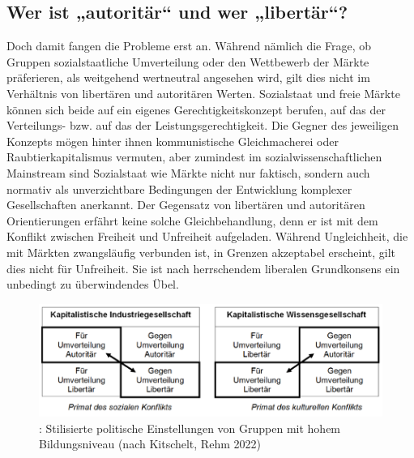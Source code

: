 \begin{multicols*}{2}
\section{Wer ist „autoritär“ und wer „libertär“?}

\noindent Doch damit fangen die Probleme erst an. Während nämlich die Frage, ob Gruppen sozialstaatliche Umverteilung oder den Wettbewerb der Märkte präferieren, als weitgehend wertneutral angesehen wird, gilt dies nicht im Verhältnis von libertären und autoritären Werten. Sozialstaat und freie Märkte können sich beide auf ein eigenes Gerechtigkeitskonzept berufen, auf das der Verteilungs- bzw. auf das der Leistungsgerechtigkeit. Die Gegner des jeweiligen Konzepts mögen hinter ihnen kommunistische Gleichmacherei oder Raubtierkapitalismus vermuten, aber zumindest im sozialwissenschaftlichen Mainstream sind Sozialstaat wie Märkte nicht nur faktisch, sondern auch normativ als unverzichtbare Bedingungen der Entwicklung komplexer Gesellschaften anerkannt. Der Gegensatz von libertären und autoritären Orientierungen erfährt keine solche Gleichbehandlung, denn er ist mit dem Konflikt zwischen Freiheit und Unfreiheit aufgeladen. Während Ungleichheit, die mit Märkten zwangsläufig verbunden ist, in Grenzen akzeptabel erscheint, gilt dies nicht für Unfreiheit. Sie ist nach herrschendem liberalen Grundkonsens ein unbedingt zu überwindendes Übel.

\begin{figure}
    \caption{: Stilisierte politische Einstellungen von Gruppen mit hohem Bildungsniveau (nach Kitschelt, Rehm 2022)}
    \includegraphics[width=\textwidth,height=\textheight,keepaspectratio]{brie2.png} 
\end{figure}


\end{multicols*}
